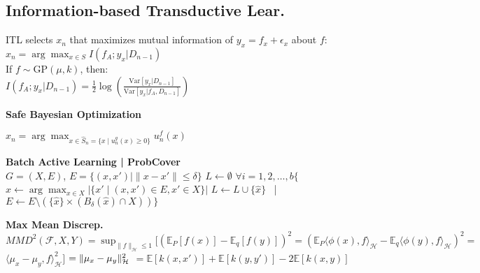 \subsection*{Information-based Transductive Lear.}
ITL selects \( x_n \) that maximizes mutual information of \( y_x = f_x + \epsilon_x \) about \( f \):
\\ $x_n = \arg\max_{x \in S} I(f_A; y_x | D_{n-1})$ \\
If \( f \sim \text{GP}(\mu, k) \), then: \\
$I(f_A; y_x | D_{n-1}) = \frac{1}{2} \log \left( \frac{\text{Var}[y_x | D_{n-1}]}{\text{Var}[y_x | f_A, D_{n-1}]} \right)$

\textbf{Safe Bayesian Optimization}

$x_n = \arg\max_{x \in \hat{S}_n= \{ x \mid u^g_n(x) \geq 0 \}} u^f_n(x)$

\textbf{Batch Active Learning | ProbCover} \\
$G {=} (X, E)$, $E {=} \{(x, x') \mid \|x {-} x'\| {\leq} \delta\}$
$L {\gets} \emptyset$
$\forall i = 1, 2, \dots, b\{$
$\hat{x} \gets \arg\max_{x \in X} |\{x' \mid (x, x') \in E, x' \in X\}|$
$L {\gets} L {\cup} \{\hat{x}\}$ \ | \ \ 
$E {\gets} E {\setminus} (\{\hat{x}\} {\times} (B_{\delta}(\hat{x}) \cap X))\}$

\textbf{Max Mean Discrep.}
$MMD^2 (\mathcal{F}, X, Y) = \sup_{\| f \|_{\mathcal{H}} \leq 1} [( \mathbb{E}_P[f(x)] - \mathbb{E}_q[f(y)] )^2 = ( \mathbb{E}_P \langle \phi(x), f \rangle_{\mathcal{H}} - \mathbb{E}_q \langle \phi(y), f \rangle_{\mathcal{H}} ) ^2 = $
$\langle \mu_x - \mu_y, f \rangle_{\mathcal{H}} ^2 ]$
$= \| \mu_x - \mu_y \|_{\mathcal{H}}^2 \\$
$= \mathbb{E} [k(x, x')] + \mathbb{E} [k(y, y')] - 2 \mathbb{E} [k(x, y)]$


